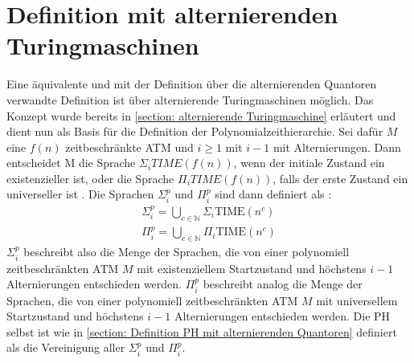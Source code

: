 \section{Definition mit alternierenden Turingmaschinen} \label{section: Definition PH mit ATM}
Eine äquivalente und mit der Definition über die alternierenden Quantoren verwandte Definition ist über alternierende Turingmaschinen möglich.
Das Konzept wurde bereits in \ref{section: alternierende Turingmaschine} erläutert und dient nun als Basis für die Definition der Polynomialzeithierarchie.
Sei dafür $M$ eine $f(n)$ zeitbeschränkte ATM und $i \geq 1$  mit $i - 1$ mit  Alternierungen. Dann entscheidet M die Sprache $\Sigma_i TIME(f(n))$, wenn der initiale Zustand ein existenzieller ist,
oder die Sprache $\Pi_i TIME(f(n))$, falls der erste Zustand ein universeller ist \cite{arora_computational_2009}.
Die Sprachen $\Sigma^p_i$ und $\Pi^p_i$ sind dann definiert als \cite{arora_computational_2009}:
\begin{align*}
    \Sigma^p_i = \bigcup_{c \in \mathbb{N}} \Sigma_i \text{TIME}(n^c) \\
    \Pi^p_i = \bigcup_{c \in \mathbb{N}} \Pi_i \text{TIME}(n^c)
\end{align*}
$\Sigma^p_i$ beschreibt also die Menge der Sprachen, die von einer polynomiell zeitbeschränkten ATM $M$ mit existenziellem Startzustand und höchstens $i-1$ Alternierungen entschieden werden.
$\Pi^p_i$ beschreibt analog die Menge der Sprachen, die von einer polynomiell zeitbeschränkten ATM $M$ mit universellem Startzustand und höchstens $i-1$ Alternierungen entschieden werden.
Die PH selbst ist wie in \ref{section: Definition PH mit alternierenden Quantoren} definiert als die Vereinigung aller $\Sigma^p_i$ und $\Pi^p_i$.

